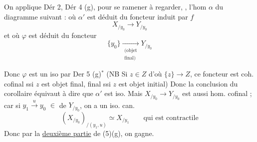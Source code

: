 On applique Dér 2, Dér 4 (g), pour se ramener à regarder, , l'hom $\alpha$ du diagramme  suivant :
où $\alpha'$ est déduit du foncteur induit par $f$
\[
 X_{/y_0}\longrightarrow Y_{/y_0}
\]
et où $\varphi$ est déduit du foncteur
\[
 \{y_0\}\xrightarrow[\substack{(\text{objet}\\ \text{final})}]{} Y_{/y_0}
\]

Donc $\varphi$ est un iso par Der 5 (g)$^*$ (NB Si $z\in Z$ d'où $\{z\}\to Z$, ce foncteur est coh. cofinal ssi $z$ est objet final,   final ssi $z$ est objet initial) Donc la conclusion du corollaire équivaut à dire que $\alpha'$ est iso. Mais $X_{/y_0}\to Y_{/y_0}$ est aussi hom. cofinal \deleted{\unsure{\(\longrightarrow\)}} ; car si $y_1\xrightarrow{u}y_0$  $\in$ de $Y_{/y_0}$, on a un iso. can.
\[
 (X_{/y_0})_{/(y_1,u)}\simeq X_{/y_1}\qquad\text{qui est contractile}
\]
Donc par la \uline{deuxième partie} de  (5)(g), on gagne.
